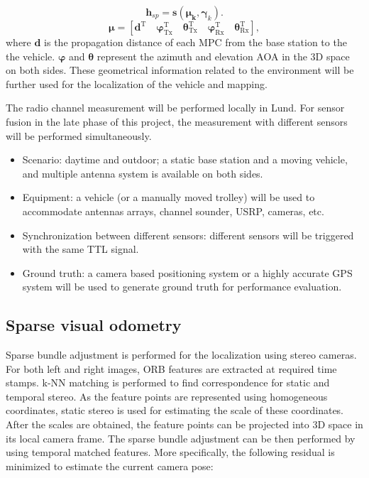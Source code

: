 \begin{equation}
\mathbf{h}_{sp} = \textbf{s}(\mathbf{\boldsymbol{\mu}_k}, \mathbf{\boldsymbol{\gamma}}_k).
\label{eq:channelmodel}
\end{equation}
\begin{equation}
\mathbf{\boldsymbol{\mu}} = [\mathbf{\boldsymbol{d}}^\text{T} \quad  \mathbf{\boldsymbol{\varphi}}^\text{T}_\text{Tx} \quad  \mathbf{\boldsymbol{\theta}}^\text{T}_\text{Tx} \quad \mathbf{\boldsymbol{\varphi}}^\text{T}_\text{Rx} \quad  \mathbf{\boldsymbol{\theta}}^\text{T}_\text{Rx}],
\end{equation}
where $ \mathbf{\boldsymbol{d}} $ is the propagation distance of each
\gls{MPC} from the base station to the the vehicle. $
\mathbf{\boldsymbol{\varphi}} $ and $ \mathbf{\boldsymbol{\theta}} $
represent the azimuth and elevation \gls{AOA} in the 3D space on both
sides. These geometrical information related to the environment will
be further used for the localization of the vehicle and mapping.


The radio channel measurement will be performed locally in Lund. For
sensor fusion in the late phase of this project, the measurement with
different sensors will be performed simultaneously.

\begin{itemize}
\item Scenario: daytime and outdoor; a static base station and a
  moving vehicle, and multiple antenna system is available on both
  sides.
\item Equipment: a vehicle (or a manually moved trolley) will be used
  to accommodate antennas arrays, channel sounder, \gls{USRP},
  cameras, etc.
\item Synchronization between different sensors: different sensors
  will be triggered with the same TTL signal.
\item Ground truth: a camera based positioning system or a highly
  accurate GPS system will be used to generate ground truth for
  performance evaluation.
\end{itemize}

\subsection{Sparse visual odometry}

Sparse bundle adjustment is performed for the localization using
stereo cameras. For both left and right images, \gls{ORB} features are
extracted at required time stamps. \gls{k-NN} matching
is performed to find correspondence for static and temporal stereo. As
the feature points are represented using homogeneous coordinates,
static stereo is used for estimating the scale of these
coordinates. After the scales are obtained, the feature points can be
projected into 3D space in its local camera frame. The sparse bundle
adjustment can be then performed by using temporal matched
features. More specifically, the following residual is minimized to
estimate the current camera pose:


